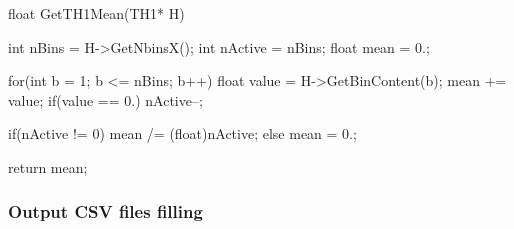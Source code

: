 	\begin{code}
	\begin{cppcode}
float GetTH1Mean(TH1* H){
    int nBins = H->GetNbinsX();
    int nActive = nBins;
    float mean = 0.;

    for(int b = 1; b <= nBins; b++){
        float value = H->GetBinContent(b);
        mean += value;
        if(value == 0.) nActive--;
    }

    if(nActive != 0) mean /= (float)nActive;
    else mean = 0.;

    return mean;
}
	\end{cppcode}
	\label{cpp:th1mean}
	\vspace{5mm}
	\end{code}
	
		\subsubsection{Output CSV files filling}
		\label{app2:sssec:CSVoutput}
		
